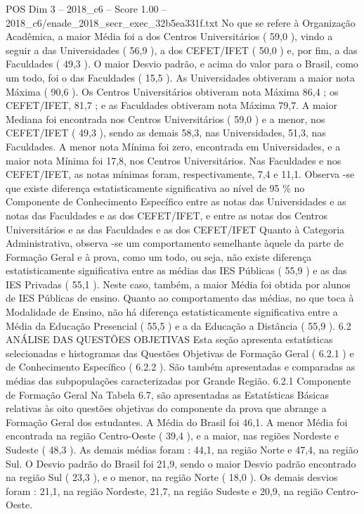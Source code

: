 \begin{textsample}{POS Dim 3 – 2018\_c6 – Score 1.00 – 2018\_c6/enade\_2018\_secr\_exec\_32b5ea331f.txt}
No que se refere à Organização Acadêmica, a maior Média foi a dos Centros Universitários ( 59,0 ), vindo a seguir a das Universidades ( 56,9 ), a dos CEFET/IFET ( 50,0 ) e, por fim, a das Faculdades ( 49,3 ).
O maior Desvio padrão, e acima do valor para o Brasil, como um todo, foi o das Faculdades ( 15,5 ).
As Universidades obtiveram a maior nota Máxima ( 90,6 ).
Os Centros Universitários obtiveram nota Máxima 86,4 ; os CEFET/IFET, 81,7 ; e as Faculdades obtiveram nota Máxima 79,7.
A maior Mediana foi encontrada nos Centros Universitários ( 59,0 ) e a menor, nos CEFET/IFET ( 49,3 ), sendo as demais 58,3, nas Universidades, 51,3, nas Faculdades.
A menor nota Mínima foi zero, encontrada em Universidades, e a maior nota Mínima foi 17,8, nos Centros Universitários.
Nas Faculdades e nos CEFET/IFET, as notas mínimas foram, respectivamente, 7,4 e 11,1.
Observa -se que existe diferença estatisticamente significativa ao nível de 95 \% no Componente de Conhecimento Específico entre as notas das Universidades e as notas das Faculdades e as dos CEFET/IFET, e entre as notas dos Centros Universitários e as das Faculdades e as dos CEFET/IFET Quanto à Categoria Administrativa, observa -se um comportamento semelhante àquele da parte de Formação Geral e à prova, como um todo, ou seja, não existe diferença estatisticamente significativa entre as médias das IES Públicas ( 55,9 ) e as das IES Privadas ( 55,1 ).
Neste caso, também, a maior Média foi obtida por alunos de IES Públicas de ensino.
Quanto ao comportamento das médias, no que toca à Modalidade de Ensino, não há diferença estatisticamente significativa entre a Média da Educação Presencial ( 55,5 ) e a da Educação a Distância ( 55,9 ). 6.2 ANÁLISE DAS QUESTÕES OBJETIVAS Esta seção apresenta estatísticas selecionadas e histogramas das Questões Objetivas de Formação Geral ( 6.2.1 ) e de Conhecimento Específico ( 6.2.2 ).
São também apresentadas e comparadas as médias das subpopulações caracterizadas por Grande Região. 6.2.1 Componente de Formação Geral Na Tabela 6.7, são apresentadas as Estatísticas Básicas relativas às oito questões objetivas do componente da prova que abrange a Formação Geral dos estudantes.
A Média do Brasil foi 46,1.
A menor Média foi encontrada na região Centro-Oeste ( 39,4 ), e a maior, nas regiões Nordeste e Sudeste ( 48,3 ).
As demais médias foram : 44,1, na região Norte e 47,4, na região Sul.
O Desvio padrão do Brasil foi 21,9, sendo o maior Desvio padrão encontrado na região Sul ( 23,3 ), e o menor, na região Norte ( 18,0 ).
Os demais desvios foram : 21,1, na região Nordeste, 21,7, na região Sudeste e 20,9, na região Centro-Oeste.

\end{textsample}
